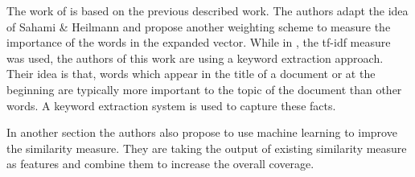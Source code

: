 The work of \cite{Yih:2007:ISM:1619797.1619884} is based on the previous described work. The authors adapt the idea of Sahami \& Heilmann and propose another weighting scheme to measure the importance of the words in the expanded vector. While in \cite{Sahami:2006:WKF:1135777.1135834}, the tf-idf measure was used, the authors of this work are using a keyword extraction approach. Their idea is that, words which appear in the title of a document or at the beginning are typically more important to the topic of the document than other words. A keyword extraction system is used to capture these facts.


In another section the authors also propose to use machine learning to improve the similarity measure. They are taking the output of existing similarity measure as features and combine them to increase the overall coverage. 



